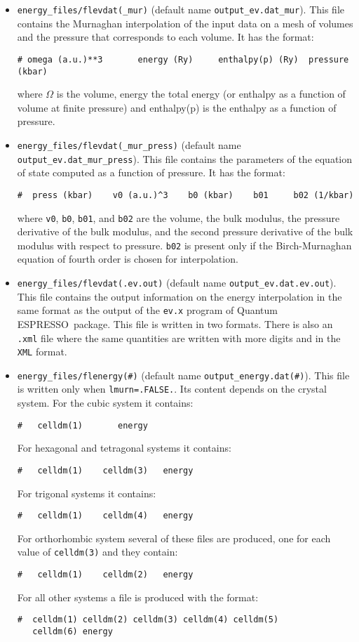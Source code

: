 \documentclass[12pt,a4paper,twoside]{report}
\def\qe{{\sc Quantum ESPRESSO}}
\begin{document}
\begin{itemize}
\item 
\texttt{energy\_files/flevdat(\_mur)} 
(default name \texttt{output\_ev.dat\_mur}).
This file contains the Murnaghan interpolation of the input data on a 
mesh of volumes and the pressure that corresponds to each volume. It has
the format:
\begin{verbatim}
# omega (a.u.)**3       energy (Ry)     enthalpy(p) (Ry)  pressure (kbar)
\end{verbatim}
where $\Omega$ is the volume, energy the total energy 
(or enthalpy as a function of volume at finite pressure) and 
enthalpy(p) is the enthalpy as a function of pressure. 

\item 
\texttt{energy\_files/flevdat(\_mur\_press)} 
(default name \texttt{output\_ev.dat\_mur\_press}).
This file contains the parameters of the equation of state 
computed as a function of pressure. It has the format: 
\begin{verbatim}
#  press (kbar)    v0 (a.u.)^3    b0 (kbar)    b01     b02 (1/kbar)
\end{verbatim}
where \texttt{v0}, \texttt{b0}, \texttt{b01}, and \texttt{b02} are the
volume, the bulk modulus, the pressure derivative of the bulk modulus,
and the second pressure derivative of the bulk modulus with respect to
pressure. \texttt{b02} is present only if the Birch-Murnaghan equation
of fourth order is chosen for interpolation.

\item 
\texttt{energy\_files/flevdat(.ev.out)} 
(default name \texttt{output\_ev.dat.ev.out}).
This file contains the output information on the energy interpolation 
in the same format as the output of the \texttt{ev.x} program of 
\qe\ package. This file is written in two formats.
There is also an \texttt{.xml} file where the same quantities are written 
with more digits and in the \texttt{XML} format.

\item 
\texttt{energy\_files/flenergy(\#)} 
(default name \texttt{output\_energy.dat(\#)}). This file is written only
when \texttt{lmurn=.FALSE.}. Its content depends on the crystal system.
For the cubic system it contains:
\begin{verbatim}
#   celldm(1)       energy
\end{verbatim}
For hexagonal and tetragonal systems it contains:
\begin{verbatim}
#   celldm(1)    celldm(3)   energy
\end{verbatim}
For trigonal systems it contains:
\begin{verbatim}
#   celldm(1)    celldm(4)   energy
\end{verbatim}
For orthorhombic system several of these files are produced, one for each
value of \texttt{celldm(3)} and they contain:
\begin{verbatim}
#   celldm(1)    celldm(2)   energy
\end{verbatim}
For all other systems a file is produced with the format:
\begin{verbatim}
#  celldm(1) celldm(2) celldm(3) celldm(4) celldm(5) 
   celldm(6) energy
\end{verbatim}


\end{itemize}
\end{document}
